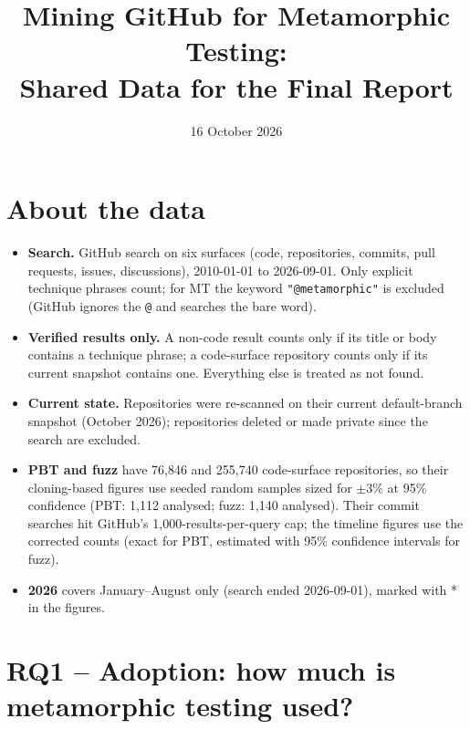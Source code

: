 \documentclass[11pt,a4paper]{article}
\title{Mining GitHub for Metamorphic Testing:\\ Shared Data for the Final Report}
\date{16 October 2026}
\author{}
\begin{document}
\maketitle
\vspace{-2em}

\section*{About the data}
\begin{itemize}[leftmargin=1.2em,itemsep=1pt]
\item \textbf{Search.} GitHub search on six surfaces (code, repositories, commits, pull requests, issues, discussions), 2010-01-01 to 2026-09-01. Only explicit technique phrases count; for MT the keyword \texttt{"@metamorphic"} is excluded (GitHub ignores the \texttt{@} and searches the bare word).
\item \textbf{Verified results only.} A non-code result counts only if its title or body contains a technique phrase; a code-surface repository counts only if its current snapshot contains one. Everything else is treated as not found.
\item \textbf{Current state.} Repositories were re-scanned on their current default-branch snapshot (October 2026); repositories deleted or made private since the search are excluded.
\item \textbf{PBT and fuzz} have 76,846 and 255,740 code-surface repositories, so their cloning-based figures use seeded random samples sized for $\pm$3\% at 95\% confidence (PBT: 1,112 analysed; fuzz: 1,140 analysed). Their commit searches hit GitHub's 1{,}000-results-per-query cap; the timeline figures use the corrected counts (exact for PBT, estimated with 95\% confidence intervals for fuzz).
\item \textbf{2026} covers January--August only (search ended 2026-09-01), marked with * in the figures.
\end{itemize}

\section{RQ1 -- Adoption: how much is metamorphic testing used?}
\end{document}
